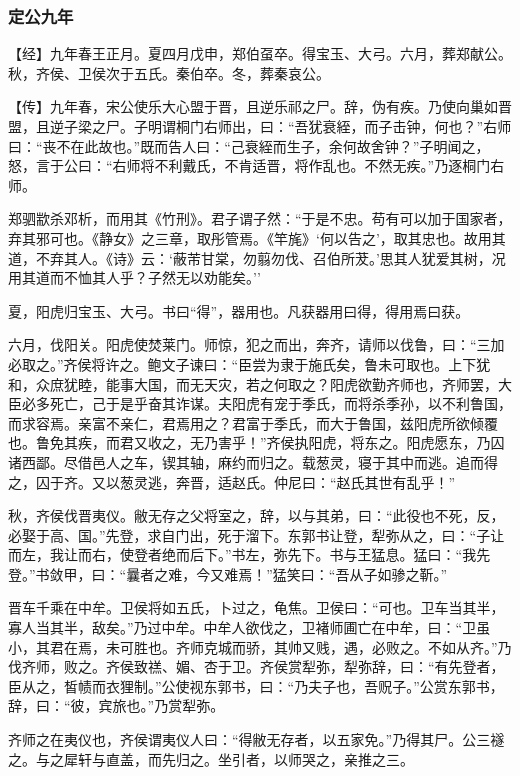 \documentclass[]{article}
\begin{document}
\hypertarget{header-n2971}{%
\subsubsection{定公九年}\label{header-n2971}}

【经】九年春王正月。夏四月戊申，郑伯虿卒。得宝玉、大弓。六月，葬郑献公。秋，齐侯、卫侯次于五氏。秦伯卒。冬，葬秦哀公。

【传】九年春，宋公使乐大心盟于晋，且逆乐祁之尸。辞，伪有疾。乃使向巢如晋盟，且逆子梁之尸。子明谓桐门右师出，曰：``吾犹衰絰，而子击钟，何也？''右师曰：``丧不在此故也。''既而告人曰：``己衰絰而生子，余何故舍钟？''子明闻之，怒，言于公曰：``右师将不利戴氏，不肯适晋，将作乱也。不然无疾。''乃逐桐门右师。

郑驷歂杀邓析，而用其《竹刑》。君子谓子然：``于是不忠。苟有可以加于国家者，弃其邪可也。《静女》之三章，取彤管焉。《竿旄》`何以告之'，取其忠也。故用其道，不弃其人。《诗》云：`蔽芾甘棠，勿翦勿伐、召伯所茇。'思其人犹爱其树，况用其道而不恤其人乎？子然无以劝能矣。''

夏，阳虎归宝玉、大弓。书曰``得''，器用也。凡获器用曰得，得用焉曰获。

六月，伐阳关。阳虎使焚莱门。师惊，犯之而出，奔齐，请师以伐鲁，曰：``三加必取之。''齐侯将许之。鲍文子谏曰：``臣尝为隶于施氏矣，鲁未可取也。上下犹和，众庶犹睦，能事大国，而无天灾，若之何取之？阳虎欲勤齐师也，齐师罢，大臣必多死亡，己于是乎奋其诈谋。夫阳虎有宠于季氏，而将杀季孙，以不利鲁国，而求容焉。亲富不亲仁，君焉用之？君富于季氏，而大于鲁国，兹阳虎所欲倾覆也。鲁免其疾，而君又收之，无乃害乎！''齐侯执阳虎，将东之。阳虎愿东，乃囚诸西鄙。尽借邑人之车，锲其轴，麻约而归之。载葱灵，寝于其中而逃。追而得之，囚于齐。又以葱灵逃，奔晋，适赵氏。仲尼曰：``赵氏其世有乱乎！''

秋，齐侯伐晋夷仪。敝无存之父将室之，辞，以与其弟，曰：``此役也不死，反，必娶于高、国。''先登，求自门出，死于溜下。东郭书让登，犁弥从之，曰：``子让而左，我让而右，使登者绝而后下。''书左，弥先下。书与王猛息。猛曰：``我先登。''书敛甲，曰：``曩者之难，今又难焉！''猛笑曰：``吾从子如骖之靳。''

晋车千乘在中牟。卫侯将如五氏，卜过之，龟焦。卫侯曰：``可也。卫车当其半，寡人当其半，敌矣。''乃过中牟。中牟人欲伐之，卫褚师圃亡在中牟，曰：``卫虽小，其君在焉，未可胜也。齐师克城而骄，其帅又贱，遇，必败之。不如从齐。''乃伐齐师，败之。齐侯致禚、媚、杏于卫。齐侯赏犁弥，犁弥辞，曰：``有先登者，臣从之，皙帻而衣狸制。''公使视东郭书，曰：``乃夫子也，吾贶子。''公赏东郭书，辞，曰：``彼，宾旅也。''乃赏犁弥。

齐师之在夷仪也，齐侯谓夷仪人曰：``得敝无存者，以五家免。''乃得其尸。公三襚之。与之犀轩与直盖，而先归之。坐引者，以师哭之，亲推之三。
\end{document}
